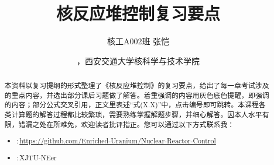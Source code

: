 \documentclass[palatino, classical, simple name]{einfart}
\numberwithin{equation}{section}
\newcommand{\highlight}[2]{\colorbox{#1!17}{#2}}
\begin{document}
\title{核反应堆控制复习要点}
\author{核工A002班 张恺}
\date{\zhtoday，西安交通大学核科学与技术学院}

\maketitle

\begin{abstract}
    本资料以复习提纲的形式整理了《核反应堆控制》的复习要点，给出了每一章考试涉及的重点内容，并选出部分课后习题做了解答。着重强调的内容用灰色底色提醒，即\highlight{gray}{强调的内容}；部分公式交叉引用，正文里表述“式(X.X)”中，点击编号即可跳转。本课程各类计算题的解答过程都比较繁琐，需要熟练掌握解题步骤，并细心解答。因本人水平有限，错漏之处在所难免，欢迎读者批评指正。您可以通过以下方式联系我：
    \begin{itemize}
        \item {\faGithub}:\,\href{https://github.com/Enriched-Uranium/Nuclear-Reactor-Control}{https://github.com/Enriched-Uranium/Nuclear-Reactor-Control}
        \item {\faWeixin}:\,XJTU-NEer
    \end{itemize}
\end{abstract}

\setcounter{tocdepth}{1}
{\tableofcontents}


\medskip












\end{document}
